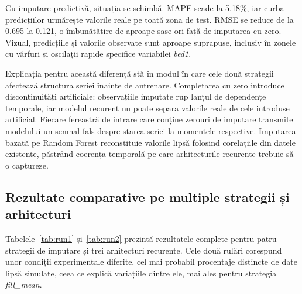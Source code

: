 Cu imputare predictivă, situația se schimbă. MAPE scade la 5.18\%, iar curba predicțiilor urmărește valorile reale pe toată zona de test. RMSE se reduce de la 0.695 la 0.121, o îmbunătățire de aproape șase ori față de imputarea cu zero. Vizual, predicțiile și valorile observate sunt aproape suprapuse, inclusiv în zonele cu vârfuri și oscilații rapide specifice variabilei \textit{bed1}.

Explicația pentru această diferență stă în modul în care cele două strategii afectează structura seriei înainte de antrenare. Completarea cu zero introduce discontinuități artificiale: observațiile imputate rup lanțul de dependențe temporale, iar modelul recurent nu poate separa valorile reale de cele introduse artificial. Fiecare fereastră de intrare care conține zerouri de imputare transmite modelului un semnal fals despre starea seriei la momentele respective. Imputarea bazată pe Random Forest reconstituie valorile lipsă folosind corelațiile din datele existente, păstrând coerența temporală pe care arhitecturile recurente trebuie să o captureze.

\subsection{Rezultate comparative pe multiple strategii și arhitecturi}

Tabelele~\ref{tab:run1} și~\ref{tab:run2} prezintă rezultatele complete pentru patru strategii de imputare și trei arhitecturi recurente. Cele două rulări corespund unor condiții experimentale diferite, cel mai probabil procentaje distincte de date lipsă simulate, ceea ce explică variațiile dintre ele, mai ales pentru strategia \textit{fill\_mean}.

